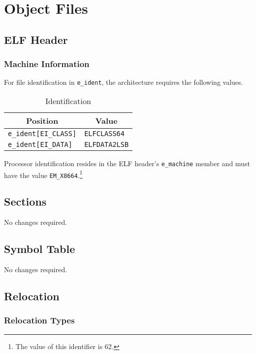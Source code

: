 
\chapter{Object Files}

\section{ELF Header}

\subsection{Machine Information}

For file identification in \texttt{e_ident}, the \xARCH architecture
requires the following values.

\begin{table}[H]
\Hrule
  \caption{\xARCH Identification}
  \begin{center}
    \begin{tabular}[t]{l|l}
      \multicolumn{1}{c}{Position} & \multicolumn{1}{c}{Value} \\
      \hline
      \texttt{e_ident[EI_CLASS]} & \texttt{ELFCLASS64} \\
      \texttt{e_ident[EI_DATA]} & \texttt{ELFDATA2LSB}
    \end{tabular}
  \end{center}
\Hrule
\end{table}

Processor identification resides in the ELF header's
\texttt{e_machine} member and must have the value
\texttt{EM_X8664}.\footnote{The value of this identifier is 62.}

\section{Sections}

No changes required.

\section{Symbol Table}

No changes required.

\section{Relocation}

\subsection{Relocation Types}

